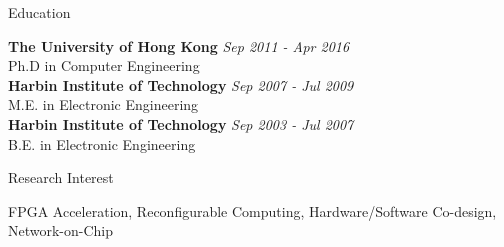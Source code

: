 \documentclass{resume} %
\begin{document}
\begin{rSection}{Education}

{\bf The University of Hong Kong} \hfill {\em Sep 2011 - Apr 2016} \\ 
Ph.D in Computer Engineering \\
{\bf Harbin Institute of Technology} \hfill {\em Sep 2007 - Jul 2009} \\
M.E. in Electronic Engineering \\
{\bf Harbin Institute of Technology} \hfill {\em Sep 2003 - Jul 2007} \\
B.E. in Electronic Engineering \\

\end{rSection}

\begin{rSection}{Research Interest}
    \vspace{-1em}
\item FPGA Acceleration, Reconfigurable Computing, Hardware/Software Co-design, Network-on-Chip
    \vspace{-0.5em}
\end{rSection}
\end{document}
